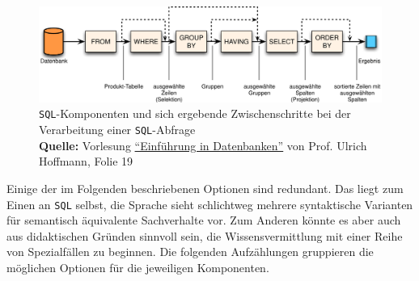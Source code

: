 \begin{figure}
  \centering \includegraphics{images/sql-steps.png}
  \caption{%
    \texttt{SQL}-Komponenten und sich ergebende Zwischenschritte bei der Verarbeitung einer \texttt{SQL}-Abfrage%
    \\\hspace{\linewidth}%
    \textbf{Quelle:} Vorlesung \href{http://www.fh-wedel.de/fileadmin/mitarbeiter/uh/WS201516/Datenbanken_04.pdf}{"`Einführung in Datenbanken"'} von Prof. Ulrich Hoffmann, Folie 19}
  \label{fig:sql-steps}
\end{figure}

Einige der im Folgenden beschriebenen Optionen sind redundant. Das liegt zum Einen an \texttt{SQL} selbst, die Sprache sieht schlichtweg mehrere syntaktische Varianten für semantisch äquivalente Sachverhalte vor. Zum Anderen könnte es aber auch aus didaktischen Gründen sinnvoll sein, die Wissensvermittlung mit einer Reihe von Spezialfällen zu beginnen. Die folgenden Aufzählungen gruppieren die möglichen Optionen für die jeweiligen Komponenten.

